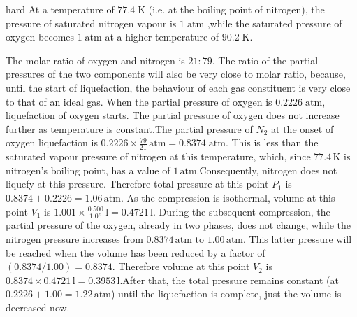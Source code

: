 \begin{solution}{hard}
At a temperature of $77.4\;\mathrm{K}$ (i.e. at the boiling point of nitrogen), the pressure of saturated nitrogen vapour is $1\;\mathrm{atm}$ ,while the saturated pressure of oxygen becomes $1\;\mathrm{atm}$ at a higher temperature of $90.2\;\mathrm{K}$.
\vspace{3mm}

\noindent The molar ratio of oxygen and nitrogen is $21:79$. The ratio of the partial pressures of the two components will also be very close to molar ratio, because, until the start of liquefaction, the behaviour of each gas constituent is very close to that of an ideal gas. When the partial pressure of oxygen is $0.2226\;\mathrm{atm}$, liquefaction of oxygen starts. The partial pressure of oxygen does not increase further as temperature is constant.The partial pressure of $N_2$ at the onset of oxygen liquefaction is $0.2226\times \frac{79}{21}\,\text{atm} = 0.8374\;\mathrm{atm}$. This is less than the saturated vapour pressure of nitrogen at this temperature, which, since $77.4\,\text{K}$ is nitrogen’s boiling point, has a value of $1\,\text{atm}$.Consequently, nitrogen does not liquefy at this pressure. Therefore total pressure at this point $P_1$ is $0.8374+0.2226=1.06 \,\text{atm}$. As the compression is isothermal, volume at this point $V_1$ is $1.001\times \frac{0.500}{1.06} \,\text{l} = 0.4721 \,\text{l}$. During the subsequent compression, the partial pressure of the oxygen, already in two phases, does not change, while the nitrogen pressure increases from $0.8374\,\text{atm}$ to $1.00\,\text{atm}$. This latter pressure will be reached when the volume has been reduced by a factor of $(0.8374/1.00)=0.8374$. Therefore volume at this point $V_2$ is $0.8374\times 0.4721\,\text{l} = 0.3953\,\text{l}$.After that, the total pressure remains constant (at $0.2226+1.00= 1.22\,\text{atm}$) until the liquefaction is complete, just the volume is decreased now.
\end{solution}